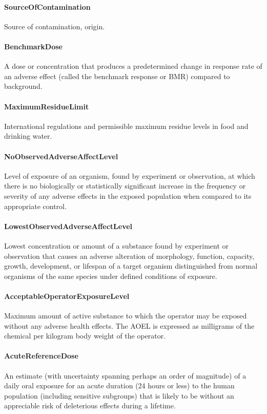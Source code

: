 \documentclass[a4paper]{report}
\begin{document}
\paragraph{SourceOfContamination}
Source of contamination, origin.

\paragraph{BenchmarkDose}
A dose or concentration that produces a predetermined change in response rate of an adverse effect (called the benchmark response or BMR) compared to background.

\paragraph{MaximumResidueLimit}
International regulations and permissible maximum residue levels in food and drinking water.

\paragraph{NoObservedAdverseAffectLevel}
Level of exposure of an organism, found by experiment or observation, at which there is no biologically or statistically significant increase in the frequency or severity of any adverse effects in the exposed population when compared to its appropriate control.

\paragraph{LowestObservedAdverseAffectLevel}
Lowest concentration or amount of a substance found by experiment or observation that causes an adverse alteration of morphology, function, capacity, growth, development, or lifespan of a target organism distinguished from normal organisms of the same species under defined conditions of exposure.

\paragraph{AcceptableOperatorExposureLevel}
Maximum amount of active substance to which the operator may be exposed without any adverse health effects. The AOEL is expressed as milligrams of the chemical per kilogram body weight of the operator.

\paragraph{AcuteReferenceDose}
An estimate (with uncertainty spanning perhaps an order of magnitude) of a daily oral exposure for an acute duration (24 hours or less) to the human population (including sensitive subgroups) that is likely to be without an appreciable risk of deleterious effects during a lifetime.
\end{document}
